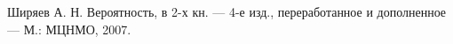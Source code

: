 


        
        
        \tableofcontents
        
        
        \begin{thebibliography}{9}
                Ширяев А. Н. Вероятность, в 2-х кн. --- 4-е изд., переработанное и дополненное --- М.: МЦНМО, 2007.
        \end{thebibliography}
